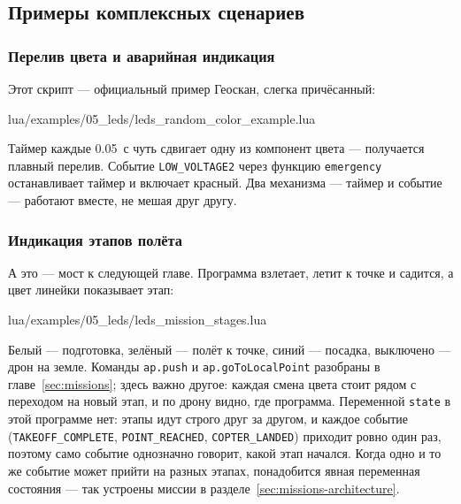 \subsection{Примеры комплексных сценариев}

\subsubsection*{Перелив цвета и аварийная индикация}

Этот скрипт --- официальный пример Геоскан, слегка причёсанный:

\begin{codefile}{lua/examples/05_leds/leds_random_color_example.lua}
\end{codefile}

Таймер каждые 0.05~с чуть сдвигает одну из компонент цвета --- получается плавный перелив. Событие \verb|LOW_VOLTAGE2| через функцию \verb|emergency| останавливает таймер и включает красный. Два механизма --- таймер и событие --- работают вместе, не мешая друг другу.

\subsubsection*{Индикация этапов полёта}

А это --- мост к следующей главе. Программа взлетает, летит к точке и садится, а цвет линейки показывает этап:

\begin{codefile}{lua/examples/05_leds/leds_mission_stages.lua}
\end{codefile}

Белый --- подготовка, зелёный --- полёт к точке, синий --- посадка, выключено --- дрон на земле. Команды \verb|ap.push| и \verb|ap.goToLocalPoint| разобраны в главе~\ref{sec:missions}; здесь важно другое: каждая смена цвета стоит рядом с переходом на новый этап, и по дрону видно, где программа. Переменной \verb|state| в этой программе нет: этапы идут строго друг за другом, и каждое событие (\verb|TAKEOFF_COMPLETE|, \verb|POINT_REACHED|, \verb|COPTER_LANDED|) приходит ровно один раз, поэтому само событие однозначно говорит, какой этап начался. Когда одно и то же событие может прийти на разных этапах, понадобится явная переменная состояния --- так устроены миссии в разделе~\ref{sec:missions-architecture}.
